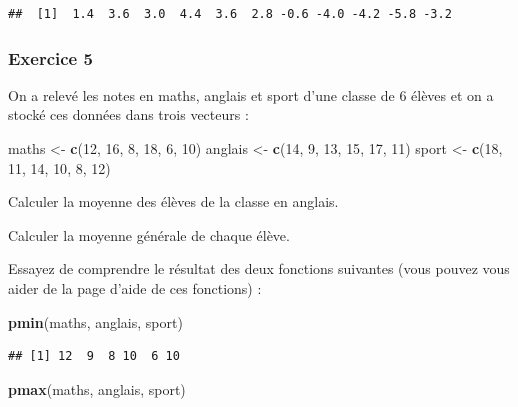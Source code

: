 \documentclass[
  12pt,
]{book}
\newenvironment{Shaded}{\begin{snugshade}}{\end{snugshade}}
\newcommand{\DecValTok}[1]{\textcolor[rgb]{0.00,0.00,0.81}{#1}}
\newcommand{\KeywordTok}[1]{\textcolor[rgb]{0.13,0.29,0.53}{\textbf{#1}}}
\newcommand{\NormalTok}[1]{#1}
\newcommand{\StringTok}[1]{\textcolor[rgb]{0.31,0.60,0.02}{#1}}
\begin{document}
\begin{verbatim}
##  [1]  1.4  3.6  3.0  4.4  3.6  2.8 -0.6 -4.0 -4.2 -5.8 -3.2
\end{verbatim}

\hypertarget{exercice-5}{%
\subsubsection{Exercice 5}\label{exercice-5}}

On a relevé les notes en maths, anglais et sport d'une classe de 6 élèves et on a stocké ces données dans trois vecteurs :

\begin{Shaded}
\begin{Highlighting}[]
\NormalTok{maths \textless{}{-}}\StringTok{ }\KeywordTok{c}\NormalTok{(}\DecValTok{12}\NormalTok{, }\DecValTok{16}\NormalTok{, }\DecValTok{8}\NormalTok{, }\DecValTok{18}\NormalTok{, }\DecValTok{6}\NormalTok{, }\DecValTok{10}\NormalTok{)}
\NormalTok{anglais \textless{}{-}}\StringTok{ }\KeywordTok{c}\NormalTok{(}\DecValTok{14}\NormalTok{, }\DecValTok{9}\NormalTok{, }\DecValTok{13}\NormalTok{, }\DecValTok{15}\NormalTok{, }\DecValTok{17}\NormalTok{, }\DecValTok{11}\NormalTok{)}
\NormalTok{sport \textless{}{-}}\StringTok{ }\KeywordTok{c}\NormalTok{(}\DecValTok{18}\NormalTok{, }\DecValTok{11}\NormalTok{, }\DecValTok{14}\NormalTok{, }\DecValTok{10}\NormalTok{, }\DecValTok{8}\NormalTok{, }\DecValTok{12}\NormalTok{)}
\end{Highlighting}
\end{Shaded}

Calculer la moyenne des élèves de la classe en anglais.

Calculer la moyenne générale de chaque élève.

Essayez de comprendre le résultat des deux fonctions suivantes (vous pouvez vous aider de la page d'aide de ces fonctions) :

\begin{Shaded}
\begin{Highlighting}[]
\KeywordTok{pmin}\NormalTok{(maths, anglais, sport)}
\end{Highlighting}
\end{Shaded}

\begin{verbatim}
## [1] 12  9  8 10  6 10
\end{verbatim}

\begin{Shaded}
\begin{Highlighting}[]
\KeywordTok{pmax}\NormalTok{(maths, anglais, sport)}
\end{Highlighting}
\end{Shaded}
\end{document}
